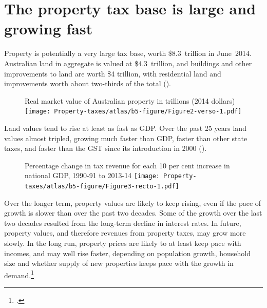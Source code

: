 \documentclass[twoside,english]{grattanBudgetRepairb5portrait}
\begin{document}
\section{The property tax base is large and growing fast\label{sec:PROP-3-2}}
Property is potentially a very large tax base, worth \$8.3~trillion in June~2014. Australian land in aggregate is valued at \$4.3~trillion, and buildings and other improvements to land are worth \$4 trillion, with residential land and improvements worth about two-thirds of the total (). 

\begin{figure}
%
{Real market value of Australian property in trillions (2014 dollars)}%
\texttt{[image: Property-taxes/atlas/b5-figure/Figure2-verso-1.pdf]}
\end{figure}

Land values tend to rise at least as fast as GDP\@. Over the past 25 years land values almost tripled, growing much faster than GDP, faster than other state taxes, and faster than the GST since its introduction in 2000 ().  

\begin{figure}
%
{Percentage change in tax revenue for each 10 per cent increase in national GDP, 1990-91 to 2013-14}
\texttt{[image: Property-taxes/atlas/b5-figure/Figure3-recto-1.pdf]}

\end{figure}


Over the longer term, property values are likely to keep rising, even if the pace of growth is slower than over the past two decades. Some of the growth over the last two decades resulted from the long-term decline in interest rates. In future, property values, and therefore revenues from property taxes, may grow more slowly.  In the long run, property prices are likely to at least keep pace with incomes, and may well rise faster, depending on population growth, household size and whether supply of new properties keeps pace with the growth in demand.\footcite[][6--7]{RBA2014SubmissionAffordableHousingInquiry}  
\end{document}
